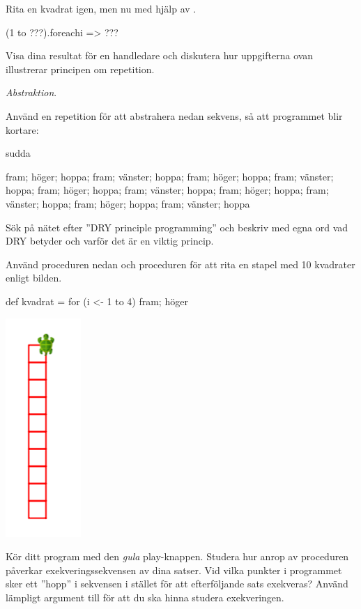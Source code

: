 \Subtask Rita en kvadrat igen, men nu med hjälp av .

\begin{Code}
(1 to ???).foreach{i => ???}
\end{Code}

\Subtask\Checkpoint Visa dina resultat för en handledare och diskutera hur uppgifterna ovan illustrerar principen om repetition.
 


\Task \textit{Abstraktion}.

\Subtask Använd en repetition för att abstrahera nedan sekvens, så att programmet blir kortare:
\begin{Code}
sudda

fram; höger; hoppa; fram; vänster; hoppa; fram; höger;
hoppa; fram; vänster; hoppa; fram; höger; hoppa; fram;
vänster; hoppa; fram; höger; hoppa; fram; vänster; hoppa;
fram; höger; hoppa; fram; vänster; hoppa
\end{Code}

\Subtask\Pen Sök på nätet efter ''DRY principle programming'' och beskriv med egna ord vad DRY betyder och varför det är en viktig princip.

\Subtask Använd proceduren  nedan och proceduren  för att rita en stapel med 10 kvadrater enligt bilden.

\begin{Code}
def kvadrat = for (i <- 1 to 4) {fram; höger}
\end{Code}

\includegraphics[scale=0.5]{../img/kojo/square-column}

\Subtask Kör ditt program med den \emph{gula} play-knappen. Studera hur anrop av proceduren  påverkar exekveringssekvensen av dina satser. Vid vilka punkter i programmet sker ett ''hopp'' i sekvensen i stället för att efterföljande sats exekveras? Använd lämpligt argument till  för att du ska hinna studera exekveringen.

